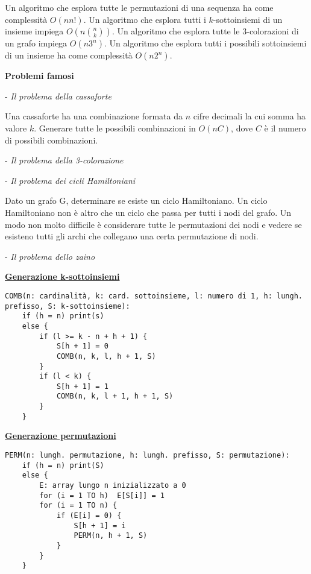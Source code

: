 \documentclass[a4paper,10pt]{article} %
\newcommand{\malgorithm}[1]{%
    {\bigbreak \par \hspace*{4pt} \underline{\textbf {#1}}}}
\renewcommand{\b}[1]{%
    {\textbf{#1}}}
\begin{document}
Un algoritmo che esplora tutte le permutazioni di una sequenza ha come complessità $O(nn!)$. Un algoritmo che esplora tutti i $k$-sottoinsiemi di un insieme impiega $O(n{{n}\choose{k}})$. Un algoritmo che esplora tutte le 3-colorazioni di un grafo impiega $O(n3^n)$. Un algoritmo che esplora tutti i possibili sottoinsiemi di un insieme ha come complessità $O(n2^n)$.
\bigskip

\centerline{\b{Problemi famosi}}
\bigskip


- \emph{ Il problema della cassaforte }\par
Una cassaforte ha una combinazione formata da $n$ cifre decimali la cui somma ha valore $k$. Generare tutte le possibili combinazioni in $O(nC)$, dove $C$ è il numero di possibili combinazioni.
\bigskip

- \emph{ Il problema della 3-colorazione }\par
\bigskip

- \emph{ Il problema dei cicli Hamiltoniani }\par
Dato un grafo G, determinare se esiste un ciclo Hamiltoniano. Un ciclo Hamiltoniano non è altro che un ciclo che passa per tutti i nodi del grafo. Un modo non molto difficile è considerare tutte le permutazioni dei nodi e vedere se esisteno tutti gli archi che collegano una certa permutazione di nodi.
\bigskip

- \emph{ Il problema dello zaino}\par
\bigskip

\malgorithm{Generazione k-sottoinsiemi}
\begin{lstlisting}
COMB(n: cardinalità, k: card. sottoinsieme, l: numero di 1, h: lungh. prefisso, S: k-sottoinsieme):
    if (h = n) print(s)
    else {
        if (l >= k - n + h + 1) {
            S[h + 1] = 0
            COMB(n, k, l, h + 1, S)
        }
        if (l < k) {
            S[h + 1] = 1
            COMB(n, k, l + 1, h + 1, S)
        }
    }
\end{lstlisting}

\malgorithm{Generazione permutazioni}
\begin{lstlisting}
PERM(n: lungh. permutazione, h: lungh. prefisso, S: permutazione):
    if (h = n) print(S)
    else {
        E: array lungo n inizializzato a 0
        for (i = 1 TO h)  E[S[i]] = 1
        for (i = 1 TO n) {
            if (E[i] = 0) {
                S[h + 1] = i
                PERM(n, h + 1, S)
            }
        }
    }
\end{lstlisting}
    
\end{document}

